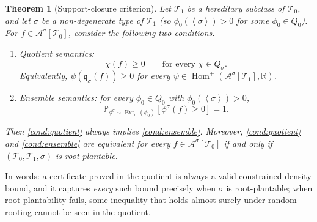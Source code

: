 \documentclass[11pt]{article}
\newtheorem{theorem}{Theorem}
\theoremstyle{definition}
\newcommand{\R}{\mathbb{R}}
\newcommand{\Prob}{\mathbb{P}}
\newcommand{\A}{\mathcal{A}}
\newcommand{\T}{\mathcal{T}}
\newcommand{\Homp}{\operatorname{Hom}^{+}}
\newcommand{\Ext}{\operatorname{Ext}}
\newcommand{\brak}[1]{\left\langle #1\right\rangle}
\newcommand{\qmap}{\mathfrak q}
\begin{document}
\begin{theorem}[Support-closure criterion]\label{thm:support-criterion}
Let $\T_1$ be a hereditary subclass of $\T_0$, and let $\sigma$ be a non-degenerate type of
$\T_1$ (so $\phi_0(\brak\sigma)>0$ for some $\phi_0\in Q_0$).  For
$f\in\A^\sigma[\T_0]$, consider the following two
conditions.
\begin{enumerate}[label=\textup{(\alph*)}, leftmargin=2.8em]
  \item\label{cond:quotient}
  Quotient semantics:
  \[
    \chi(f)\ge0\qquad\text{for every }\chi\in Q_\sigma.
  \]
  Equivalently, $\psi(\qmap_\sigma(f))\ge0$ for every
  $\psi\in\Homp(\A^\sigma[\T_1],\R)$.
  \item\label{cond:ensemble}
  Ensemble semantics:
  for every $\phi_0\in Q_0$ with $\phi_0(\brak\sigma)>0$,
  \[
    \Prob_{\phi^\sigma\sim\Ext_\sigma(\phi_0)}[\phi^\sigma(f)\ge0]=1.
  \]
\end{enumerate}
Then \ref{cond:quotient} always implies \ref{cond:ensemble}.  Moreover,
\ref{cond:quotient} and \ref{cond:ensemble} are equivalent for every
$f\in\A^\sigma[\T_0]$ if and only if $(\T_0,\T_1,\sigma)$ is root-plantable.
\end{theorem}

In words: a certificate proved in the quotient is always a valid constrained density
bound, and it captures \emph{every} such bound precisely when $\sigma$ is
root-plantable; when root-plantability fails, some inequality that holds almost surely
under random rooting cannot be seen in the quotient.
\end{document}
